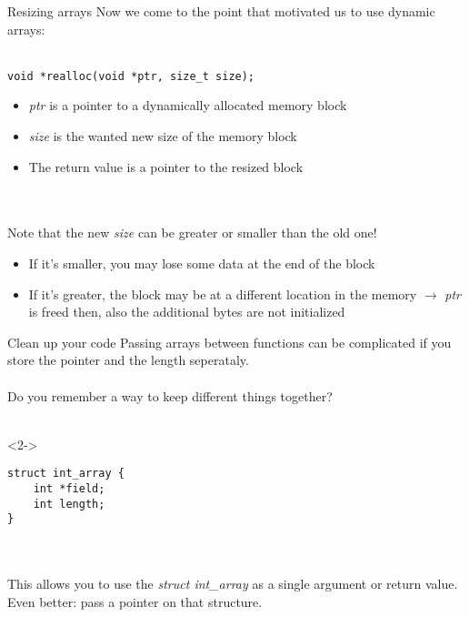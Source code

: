 \begin{frame}[fragile]{Resizing arrays}
	Now we come to the point that motivated us to use dynamic arrays:\\
	\ \\
	\begin{lstlisting}[numbers=none]
void *realloc(void *ptr, size_t size);
\end{lstlisting}
	\begin{itemize}
		\item \textit{ptr} is a pointer to a dynamically allocated memory block
		\item \textit{size} is the wanted new size of the memory block
		\item The return value is a pointer to the resized block
	\end{itemize} \ \\
	\ \\
	Note that the new \textit{size} can be greater or smaller than the old one!
	\begin{itemize}
		\item If it's smaller, you may lose some data at the end of the block
		\item If it's greater, the block may be at a different location in the memory $\rightarrow$ \textit{ptr} is freed then, also the additional bytes are not initialized
	\end{itemize}
\end{frame}
\begin{frame}[fragile]{Clean up your code}
	Passing arrays between functions can be complicated if you store the pointer and the length seperataly.\\
	\ \\
	Do you remember a way to keep different things together?\\
	\ \\
	\begin{uncoverenv}<2->
		\begin{lstlisting}[numbers=none]
struct int_array {
	int *field;
	int length;
}
\end{lstlisting}\ \\
		\ \\
		This allows you to use the \textit{struct int\_array} as a single argument or return value. Even better: pass a pointer on that structure.
	\end{uncoverenv}
\end{frame}
